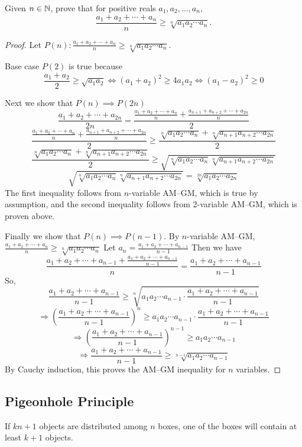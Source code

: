 \begin{example}[AM--GM inequality]
Given $n\in\mathbb N$, prove that for positive reals $a_1,a_2,\dots,a_n$,
\[\frac{a_1+a_2+\cdots+a_n}{n}\ge\sqrt[n]{a_1a_2\cdots a_n}.\]

\begin{proof}
Let $\displaystyle P(n):\frac{a_1+a_2+\cdots+a_n}{n}\ge\sqrt[n]{a_1a_2\cdots a_n}$.

Base case $P(2)$ is true because\[\frac{a_1+a_2}{2}\ge\sqrt{a_1a_2} \iff (a_1+a_2)^2\ge 4a_1a_2 \iff (a_1-a_2)^2\ge0\]

Next we show that $P(n)\implies P(2n)$
\[\frac{a_1+a_2+\cdots+a_{2n}}{2n}=\frac{\frac{a_1+a_2+\cdots+a_n}{n}+\frac{a_{n+1}+a_{n+2}+\cdots+a_{2n}}{n}}{2}\]\[\frac{\frac{a_1+a_2+\cdots+a_n}{n}+\frac{a_{n+1}+a_{n+2}+\cdots+a_{2n}}{n}}{2}\ge\frac{\sqrt[n]{a_1a_2\cdots a_n}+\sqrt[n]{a_{n+1}a_{n+2}\cdots a_{2n}}}{2}\]\[\frac{\sqrt[n]{a_1a_2\cdots a_n}+\sqrt[n]{a_{n+1}a_{n+2}\cdots a_{2n}}}{2}\ge\sqrt{\sqrt[n]{a_1a_2\cdots a_n}\sqrt[n]{a_{n+1}a_{n+2}\cdots a_{2n}}}\]\[\sqrt{\sqrt[n]{a_1a_2\cdots a_n}\sqrt[n]{a_{n+1}a_{n+2}\cdots a_{2n}}}=\sqrt[2n]{a_1a_2\cdots a_{2n}}\]
The first inequality follows from $n$-variable AM--GM, which is true by assumption, and the second inequality follows from 2-variable AM--GM, which is proven above.

Finally we show that $P(n)\implies P(n-1)$. By $n$-variable AM--GM, $\frac{a_1+a_2+\cdots+a_n}{n}\ge\sqrt[n]{a_1a_2\cdots a_n}$ Let $a_n=\frac{a_1+a_2+\cdots+a_{n-1}}{n-1}$ Then we have\[\frac{a_1+a_2+\cdots+a_{n-1}+\frac{a_1+a_2+\cdots+a_{n-1}}{n-1}}{n}=\frac{a_1+a_2+\cdots+a_{n-1}}{n-1}\]So,\[\frac{a_1+a_2+\cdots+a_{n-1}}{n-1}\ge\sqrt[n]{a_1a_2\cdots a_{n-1}\cdot \frac{a_1+a_2+\cdots+a_{n-1}}{n-1}}\]\[\Rightarrow\left(\frac{a_1+a_2+\cdots+a_{n-1}}{n-1}\right)^n\ge a_1a_2\cdots a_{n-1}\cdot \frac{a_1+a_2+\cdots+a_{n-1}}{n-1}\]\[\Rightarrow\left(\frac{a_1+a_2+\cdots+a_{n-1}}{n-1}\right)^{n-1}\ge a_1a_2\cdots a_{n-1}\]\[\Rightarrow \frac{a_1+a_2+\cdots+a_{n-1}}{n-1}\ge\sqrt[n-1]{a_1a_2\cdots a_{n-1}}\]
By Cauchy induction, this proves the AM--GM inequality for $n$ variables.
\end{proof}
\end{example}
\pagebreak

\subsection{Pigeonhole Principle}
\begin{theorem}
If $kn+1$ objects are distributed among $n$ boxes, one of the boxes will contain at least $k+1$ objects.
\end{theorem}

